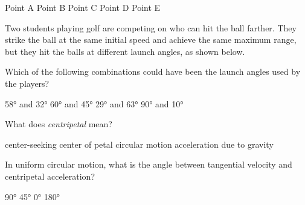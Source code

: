 \documentclass[answers]{exam}
\begin{document}
\begin{questions}
{
\begin{randomizeoneparchoices}[norandomize]
    \choice Point A
    \choice Point B
    \correctchoice Point C
    \choice Point D
    \choice Point E
\end{randomizeoneparchoices}
}

\question
Two students playing golf are competing on who can hit the ball farther. They strike the ball at the same initial speed and achieve the same maximum range, but they hit the balls at different launch angles, as shown below.

\begin{center}
\end{center}

Which of the following combinations could have been the launch angles used by the players?

\begin{randomizechoices}
    \correctchoice \ang{58} and \ang{32}
    \choice \ang{60} and \ang{45}
    \choice \ang{29} and \ang{63}
    \choice \ang{90} and \ang{10}
\end{randomizechoices}

\clearpage

\question
What does \textit{centripetal} mean?

\begin{randomizechoices}
    \correctchoice center-seeking
    \choice center of petal
    \choice circular motion
    \choice acceleration due to gravity
\end{randomizechoices}

\question
In uniform circular motion, what is the angle between tangential velocity and centripetal acceleration?

\begin{randomizechoices}
    \correctchoice \ang{90}
    \choice \ang{45}
    \choice \ang{0}
    \choice \ang{180}
\end{randomizechoices}


\end{questions}
\end{document}
